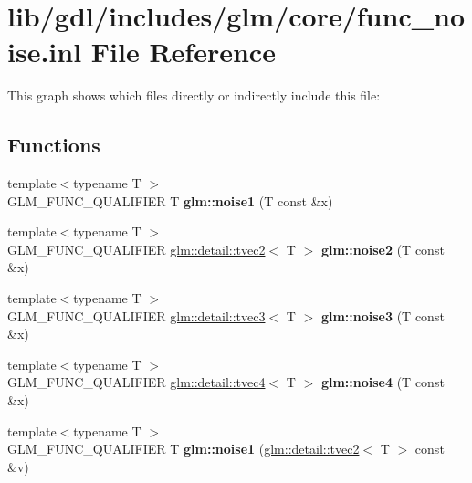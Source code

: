 \hypertarget{func__noise_8inl}{}\section{lib/gdl/includes/glm/core/func\+\_\+noise.inl File Reference}
\label{func__noise_8inl}
This graph shows which files directly or indirectly include this file\+:
\subsection*{Functions}
\begin{DoxyCompactItemize}
\item 
\hypertarget{namespaceglm_a46b13094895146ed855baa444f5b13a2}{}{\footnotesize template$<$typename T $>$ }\\G\+L\+M\+\_\+\+F\+U\+N\+C\+\_\+\+Q\+U\+A\+L\+I\+F\+I\+E\+R T {\bfseries glm\+::noise1} (T const \&x)\label{namespaceglm_a46b13094895146ed855baa444f5b13a2}

\item 
\hypertarget{namespaceglm_a537b52cd11e23488fdb340b14e230d6a}{}{\footnotesize template$<$typename T $>$ }\\G\+L\+M\+\_\+\+F\+U\+N\+C\+\_\+\+Q\+U\+A\+L\+I\+F\+I\+E\+R \hyperlink{structglm_1_1detail_1_1tvec2}{glm\+::detail\+::tvec2}$<$ T $>$ {\bfseries glm\+::noise2} (T const \&x)\label{namespaceglm_a537b52cd11e23488fdb340b14e230d6a}

\item 
\hypertarget{namespaceglm_a93f45a95a1a28541fd1bc7eca43861dd}{}{\footnotesize template$<$typename T $>$ }\\G\+L\+M\+\_\+\+F\+U\+N\+C\+\_\+\+Q\+U\+A\+L\+I\+F\+I\+E\+R \hyperlink{structglm_1_1detail_1_1tvec3}{glm\+::detail\+::tvec3}$<$ T $>$ {\bfseries glm\+::noise3} (T const \&x)\label{namespaceglm_a93f45a95a1a28541fd1bc7eca43861dd}

\item 
\hypertarget{namespaceglm_aaa8ec09066d07f381c26788fa673d1c5}{}{\footnotesize template$<$typename T $>$ }\\G\+L\+M\+\_\+\+F\+U\+N\+C\+\_\+\+Q\+U\+A\+L\+I\+F\+I\+E\+R \hyperlink{structglm_1_1detail_1_1tvec4}{glm\+::detail\+::tvec4}$<$ T $>$ {\bfseries glm\+::noise4} (T const \&x)\label{namespaceglm_aaa8ec09066d07f381c26788fa673d1c5}

\item 
\hypertarget{namespaceglm_ab95a02ef03c4ecae418d18841046aebb}{}{\footnotesize template$<$typename T $>$ }\\G\+L\+M\+\_\+\+F\+U\+N\+C\+\_\+\+Q\+U\+A\+L\+I\+F\+I\+E\+R T {\bfseries glm\+::noise1} (\hyperlink{structglm_1_1detail_1_1tvec2}{glm\+::detail\+::tvec2}$<$ T $>$ const \&v)\label{namespaceglm_ab95a02ef03c4ecae418d18841046aebb}


\end{DoxyCompactItemize}
